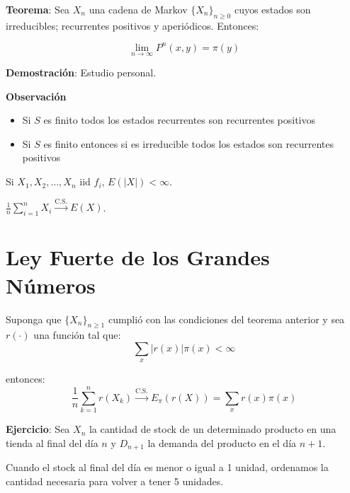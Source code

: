 \documentclass[12pt,a4paper]{article}
\begin{document}
\textbf{Teorema}: Sea $X_n$ una cadena de Markov $\{X_n\}_{n \geq 0}$ cuyos estados son irreducibles; recurrentes positivos y aperiódicos. Entonces:

\begin{equation*}
\lim_{n \to \infty} P^n(x,y) = \pi(y)
\end{equation*}

\textbf{Demostración}: Estudio personal.

\textbf{Observación}

\begin{itemize}
    \item Si $S$ es finito todos los estados recurrentes son recurrentes positivos
    \item Si $S$ es finito entonces si es irreducible todos los estados son recurrentes positivos
\end{itemize}

\begin{mdframed}[
    backgroundcolor=blue!10,
    linecolor=blue,
    linewidth=1pt,
    roundcorner=5pt,
    innertopmargin=10pt,
    innerbottommargin=10pt,
    innerleftmargin=10pt,
    innerrightmargin=10pt
]

Si $X_1, X_2, \dots, X_n$ iid $f_i$, $E(|X|) < \infty$.

$\frac{1}{n} \sum_{i=1}^{n} X_i \xrightarrow{\text{C.S.}} E(X)$.

\end{mdframed}

\section*{Ley Fuerte de los Grandes Números}

Suponga que $\{X_n\}_{n \geq 1}$ cumplió con las condiciones del teorema anterior y sea $r(\cdot)$ una función tal que:
\begin{equation}
\sum_{x} |r(x)| \pi(x) < \infty
\end{equation}

entonces:
\begin{equation}
\frac{1}{n} \sum_{k=1}^{n} r(X_k) \xrightarrow{\text{C.S.}} E_{\pi}(r(X)) = \sum_{x} r(x) \pi(x)
\end{equation}

\textbf{Ejercicio}: Sea $X_n$ la cantidad de stock de un determinado producto en una tienda al final del día $n$ y $D_{n+1}$ la demanda del producto en el día $n+1$.

Cuando el stock al final del día es menor o igual a 1 unidad, ordenamos la cantidad necesaria para volver a tener 5 unidades.
\end{document}
